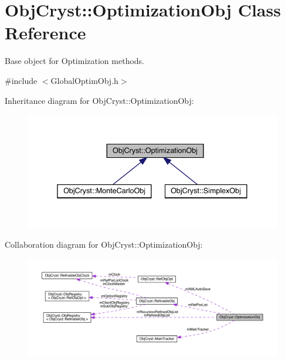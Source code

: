 \hypertarget{class_obj_cryst_1_1_optimization_obj}{}\section{Obj\+Cryst\+::Optimization\+Obj Class Reference}
\label{class_obj_cryst_1_1_optimization_obj}


Base object for Optimization methods.  




{\ttfamily \#include $<$Global\+Optim\+Obj.\+h$>$}



Inheritance diagram for Obj\+Cryst\+::Optimization\+Obj\+:
\nopagebreak
\begin{figure}[H]
\begin{center}
\leavevmode
\includegraphics[width=338pt]{class_obj_cryst_1_1_optimization_obj__inherit__graph}
\end{center}
\end{figure}


Collaboration diagram for Obj\+Cryst\+::Optimization\+Obj\+:
\nopagebreak
\begin{figure}[H]
\begin{center}
\leavevmode
\includegraphics[width=350pt]{class_obj_cryst_1_1_optimization_obj__coll__graph}
\end{center}
\end{figure}
